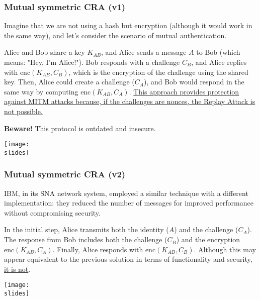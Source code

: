 \subsubsection{Mutual symmetric CRA (v1)}
\noindent
\begin{minipage}{0.4\textwidth}
  Imagine that we are not using a hash but encryption (although it would work in the same way), and let's consider the scenario of mutual authentication.

  Alice and Bob share a key \(K_{AB}\), and Alice sends a message \(A\) to Bob (which means: "Hey, I'm Alice!").
  Bob responds with a challenge \(C_B\),
  and Alice replies with \(\text{enc}(K_{AB}, C_B)\), which is the encryption of the challenge using the shared key.
  Then, Alice could create a challenge (\(C_A\)), and Bob would respond in the same way by computing \(\text{enc}(K_{AB}, C_A)\).
  \ul{This approach provides protection against MITM attacks because, if the challenges are nonces, the Replay Attack is not possible.}

  \textbf{Beware!} This protocol is outdated and insecure.
\end{minipage}
\hspace{0.05\textwidth}
\begin{minipage}{0.5\textwidth}
  \centering
  \texttt{[image: \\slides]}
\end{minipage}

\subsubsection{Mutual symmetric CRA (v2)}
\vspace*{5mm}
\noindent
\begin{minipage}{0.4\textwidth}
  IBM, in its SNA network system, employed a similar technique with a different implementation: they reduced the number of messages for improved performance without compromising security.

  In the initial step, Alice transmits both the identity (\(A\)) and the challenge (\(C_A\)). The response from Bob includes both the challenge (\(C_B\)) and the encryption \(\text{enc}(K_{AB}, C_A)\). Finally, Alice responds with \(\text{enc}(K_{AB}, C_B)\). Although this may appear equivalent to the previous solution in terms of functionality and security, \underline{it is not}.

\end{minipage}
\hspace{0.05\textwidth}
\begin{minipage}{0.5\textwidth}
  \centering
  \texttt{[image: \\slides]}
\end{minipage}




